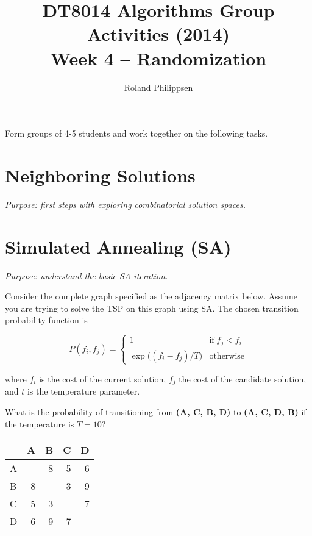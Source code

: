 \documentclass[a4paper]{article}
\begin{document}
\title{
  \large
  DT8014 Algorithms Group Activities (2014)\\
  \Large
  Week 4 -- Randomization}
\author{Roland Philippsen}
\maketitle



\noindent
Form groups of 4-5 students and work together on the following tasks.


\section*{Neighboring Solutions}

\emph{Purpose: first steps with exploring combinatorial solution spaces.}



\section*{Simulated Annealing (SA)}

\emph{Purpose: understand the basic SA iteration.}

\noindent
Consider the complete graph specified as the adjacency matrix below.
Assume you are trying to solve the TSP on this graph using SA.
The chosen transition probability function is

\begin{equation}
  P (f_i, f_j) = \begin{cases}
    1                     &\text{if}\; f_j < f_i \\
    \exp{\bigl((f_i - f_j) / T\bigr)} &\text{otherwise}
  \end{cases}
\end{equation}

\noindent
where $f_i$ is the cost of the current solution, $f_j$ the cost of the candidate solution, and $t$ is the temperature parameter.

What is the probability of transitioning from \textbf{(A, C, B, D)} to \textbf{(A, C, D, B)} if the temperature is $T=10$?

\begin{center}
  \begin{tabular}{lrrrr}
    \toprule
      &  A &  B &  C &  D \\
    \midrule
    A &    &  8 &  5 &  6 \\
    B &  8 &    &  3 &  9 \\
    C &  5 &  3 &    &  7 \\
    D &  6 &  9 &  7 &    \\
    \bottomrule
  \end{tabular}
\end{center}
\end{document}
